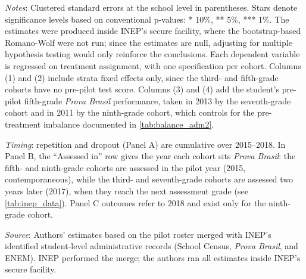 \begin{table}[ht]
\begin{threeparttable}
\begin{tablenotes}
\item \textit{Notes}: Clustered standard errors at the school level in parentheses. Stars denote significance levels based on conventional p-values: * 10\%, ** 5\%, *** 1\%. The estimates were produced inside INEP's secure facility, where the bootstrap-based Romano-Wolf were not run; since the estimates are null, adjusting for multiple hypothesis testing would only reinforce the conclusions. Each dependent variable is regressed on treatment assignment, with one specification per cohort. Columns (1) and (2) include strata fixed effects only, since the third- and fifth-grade cohorts have no pre-pilot test score. Columns (3) and (4) add the student's pre-pilot fifth-grade \textit{Prova Brasil} performance, taken in 2013 by the seventh-grade cohort and in 2011 by the ninth-grade cohort, which controls for the pre-treatment imbalance documented in \autoref{tab:balance_adm2}.
\item \textit{Timing}: repetition and dropout (Panel A) are cumulative over 2015--2018. In Panel B, the ``Assessed in'' row gives the year each cohort sits \textit{Prova Brasil}: the fifth- and ninth-grade cohorts are assessed in the pilot year (2015, contemporaneous), while the third- and seventh-grade cohorts are assessed two years later (2017), when they reach the next assessment grade (see \autoref{tab:inep_data}). Panel C outcomes refer to 2018 and exist only for the ninth-grade cohort.
\item \textit{Source}: Authors' estimates based on the pilot roster merged with INEP's identified student-level administrative records (School Census, \textit{Prova Brasil}, and ENEM). INEP performed the merge; the authors ran all estimates inside INEP's secure facility.
\end{tablenotes}
\end{threeparttable}
\end{table}


